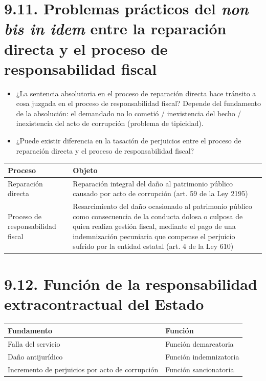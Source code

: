 \section{9.11. Problemas prácticos del \textit{non bis in idem} entre la reparación directa y el proceso de responsabilidad fiscal}
\begin{itemize}
\item ¿La sentencia absolutoria en el proceso de reparación directa hace tránsito a cosa juzgada en el proceso de responsabilidad fiscal? Depende del fundamento de la absolución: el demandado no lo cometió / inexistencia del hecho / inexistencia del acto de corrupción (problema de tipicidad).
\item ¿Puede existir diferencia en la tasación de perjuicios entre el proceso de reparación directa y el proceso de responsabilidad fiscal?
\end{itemize}
\begin{tabla}
\begin{longtable}{|>{\raggedright\arraybackslash}m{}|>{\raggedright\arraybackslash}m{}|}
\hline
\cellcolor[HTML]{1F3864}\textcolor[HTML]{FFFFFF}{\textbf{Proceso}} & \cellcolor[HTML]{1F3864}\textcolor[HTML]{FFFFFF}{\textbf{Objeto}} \\ \hline
Reparación directa & Reparación integral del daño al patrimonio público causado por acto de corrupción (art. 59 de la Ley 2195) \\ \hline
\cellcolor[HTML]{F2F5FA}Proceso de responsabilidad fiscal & \cellcolor[HTML]{F2F5FA}Resarcimiento del daño ocasionado al patrimonio público como consecuencia de la conducta dolosa o culposa de quien realiza gestión fiscal, mediante el pago de una indemnización pecuniaria que compense el perjuicio sufrido por la entidad estatal (art. 4 de la Ley 610) \\ \hline
\end{longtable}
\end{tabla}
\section{9.12. Función de la responsabilidad extracontractual del Estado}
\begin{tabla}
\begin{longtable}{|>{\raggedright\arraybackslash}m{}|>{\raggedright\arraybackslash}m{}|}
\hline
\cellcolor[HTML]{1F3864}\textcolor[HTML]{FFFFFF}{\textbf{Fundamento}} & \cellcolor[HTML]{1F3864}\textcolor[HTML]{FFFFFF}{\textbf{Función}} \\ \hline
Falla del servicio & Función demarcatoria \\ \hline
\cellcolor[HTML]{F2F5FA}Daño antijurídico & \cellcolor[HTML]{F2F5FA}Función indemnizatoria \\ \hline
Incremento de perjuicios por acto de corrupción & Función sancionatoria \\ \hline
\end{longtable}
\end{tabla}
